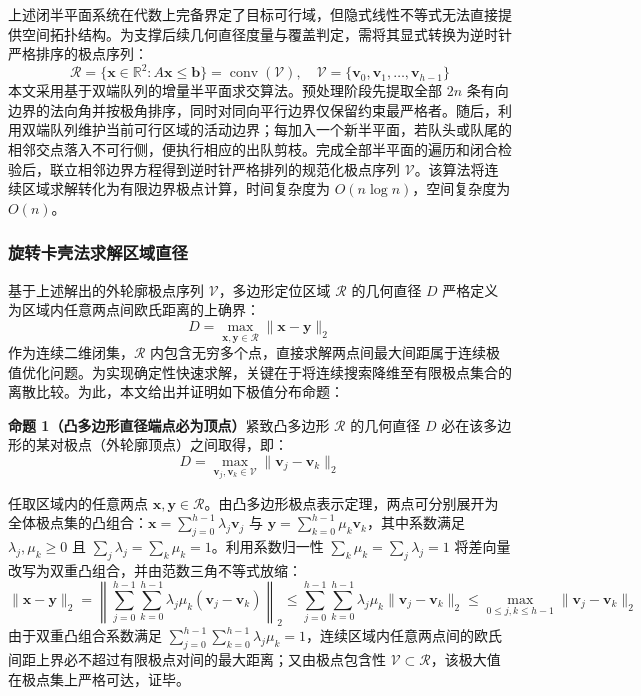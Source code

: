 \documentclass[zihao=-4,a4paper,UTF8]{ctexart}
\begin{document}
上述闭半平面系统在代数上完备界定了目标可行域，但隐式线性不等式无法直接提供空间拓扑结构。为支撑后续几何直径度量与覆盖判定，需将其显式转换为逆时针严格排序的极点序列：
\begin{equation}
    \mathcal{R} = \{\mathbf{x} \in \mathbb{R}^2 : A\mathbf{x} \le \mathbf{b}\} = \operatorname{conv}(\mathcal{V}), \quad \mathcal{V} = \{\mathbf{v}_0, \mathbf{v}_1, \dots, \mathbf{v}_{h-1}\}
\end{equation}
本文采用基于双端队列的增量半平面求交算法。预处理阶段先提取全部 $2n$ 条有向边界的法向角并按极角排序，同时对同向平行边界仅保留约束最严格者。随后，利用双端队列维护当前可行区域的活动边界；每加入一个新半平面，若队头或队尾的相邻交点落入不可行侧，便执行相应的出队剪枝。完成全部半平面的遍历和闭合检验后，联立相邻边界方程得到逆时针严格排列的规范化极点序列 $\mathcal{V}$。该算法将连续区域求解转化为有限边界极点计算，时间复杂度为 $O(n\log n)$，空间复杂度为 $O(n)$。

\subsubsection{旋转卡壳法求解区域直径}

基于上述解出的外轮廓极点序列 $\mathcal{V}$，多边形定位区域 $\mathcal{R}$ 的几何直径 $D$ 严格定义为区域内任意两点间欧氏距离的上确界：
\begin{equation}
    D = \max_{\mathbf{x}, \mathbf{y} \in \mathcal{R}} \|\mathbf{x} - \mathbf{y}\|_2
\end{equation}
作为连续二维闭集，$\mathcal{R}$ 内包含无穷多个点，直接求解两点间最大间距属于连续极值优化问题。为实现确定性快速求解，关键在于将连续搜索降维至有限极点集合的离散比较。为此，本文给出并证明如下极值分布命题：

\noindent\textbf{命题 1（凸多边形直径端点必为顶点）}\quad 紧致凸多边形 $\mathcal{R}$ 的几何直径 $D$ 必在该多边形的某对极点（外轮廓顶点）之间取得，即：
\begin{equation}
    D = \max_{\mathbf{v}_j, \mathbf{v}_k \in \mathcal{V}} \|\mathbf{v}_j - \mathbf{v}_k\|_2
\end{equation}

\begin{cumcmproof}
任取区域内的任意两点 $\mathbf{x}, \mathbf{y} \in \mathcal{R}$。由凸多边形极点表示定理，两点可分别展开为全体极点集的凸组合：$\mathbf{x} = \sum_{j=0}^{h-1} \lambda_j \mathbf{v}_j$ 与 $\mathbf{y} = \sum_{k=0}^{h-1} \mu_k \mathbf{v}_k$，其中系数满足 $\lambda_j, \mu_k \ge 0$ 且 $\sum_j \lambda_j = \sum_k \mu_k = 1$。利用系数归一性 $\sum_k \mu_k = \sum_j \lambda_j = 1$ 将差向量改写为双重凸组合，并由范数三角不等式放缩：
\begin{equation}
    \|\mathbf{x} - \mathbf{y}\|_2 = \left\| \sum_{j=0}^{h-1}\sum_{k=0}^{h-1} \lambda_j \mu_k (\mathbf{v}_j - \mathbf{v}_k) \right\|_2 
    \le \sum_{j=0}^{h-1}\sum_{k=0}^{h-1} \lambda_j \mu_k \|\mathbf{v}_j - \mathbf{v}_k\|_2 
    \le \max_{0 \le j, k \le h-1} \|\mathbf{v}_j - \mathbf{v}_k\|_2
\end{equation}
由于双重凸组合系数满足 $\sum_{j=0}^{h-1}\sum_{k=0}^{h-1} \lambda_j \mu_k = 1$，连续区域内任意两点间的欧氏间距上界必不超过有限极点对间的最大距离；又由极点包含性 $\mathcal{V} \subset \mathcal{R}$，该极大值在极点集上严格可达，证毕。
\end{cumcmproof}
\end{document}
